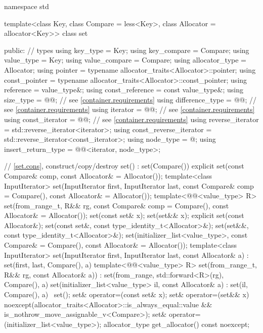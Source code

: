 \begin{codeblock}
namespace std {
  template<class Key, class Compare = less<Key>,
           class Allocator = allocator<Key>>
  class set {
  public:
    // types
    using key_type               = Key;
    using key_compare            = Compare;
    using value_type             = Key;
    using value_compare          = Compare;
    using allocator_type         = Allocator;
    using pointer                = typename allocator_traits<Allocator>::pointer;
    using const_pointer          = typename allocator_traits<Allocator>::const_pointer;
    using reference              = value_type&;
    using const_reference        = const value_type&;
    using size_type              = @@; // see \ref{container.requirements}
    using difference_type        = @@; // see \ref{container.requirements}
    using iterator               = @@; // see \ref{container.requirements}
    using const_iterator         = @@; // see \ref{container.requirements}
    using reverse_iterator       = std::reverse_iterator<iterator>;
    using const_reverse_iterator = std::reverse_iterator<const_iterator>;
    using node_type              = @\unspec@;
    using insert_return_type     = @@<iterator, node_type>;

    // \ref{set.cons}, construct/copy/destroy
    set() : set(Compare()) { }
    explicit set(const Compare& comp, const Allocator& = Allocator());
    template<class InputIterator>
      set(InputIterator first, InputIterator last,
          const Compare& comp = Compare(), const Allocator& = Allocator());
    template<@@<value_type> R>
      set(from_range_t, R&& rg, const Compare& comp = Compare(), const Allocator& = Allocator());
    set(const set& x);
    set(set&& x);
    explicit set(const Allocator&);
    set(const set&, const type_identity_t<Allocator>&);
    set(set&&, const type_identity_t<Allocator>&);
    set(initializer_list<value_type>, const Compare& = Compare(),
        const Allocator& = Allocator());
    template<class InputIterator>
      set(InputIterator first, InputIterator last, const Allocator& a)
        : set(first, last, Compare(), a) { }
    template<@@<value_type> R>
      set(from_range_t, R&& rg, const Allocator& a))
        : set(from_range, std::forward<R>(rg), Compare(), a) { }
    set(initializer_list<value_type> il, const Allocator& a)
      : set(il, Compare(), a) { }
    ~set();
    set& operator=(const set& x);
    set& operator=(set&& x)
      noexcept(allocator_traits<Allocator>::is_always_equal::value &&
               is_nothrow_move_assignable_v<Compare>);
    set& operator=(initializer_list<value_type>);
    allocator_type get_allocator() const noexcept;

}}
\end{codeblock}
